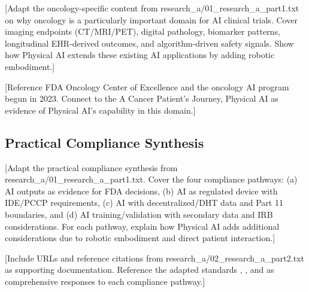 [Adapt the oncology-specific content from research\_a/01\_research\_a\_part1.txt
on why oncology is a particularly important domain for AI clinical trials.
Cover imaging endpoints (CT/MRI/PET), digital pathology, biomarker patterns,
longitudinal EHR-derived outcomes, and algorithm-driven safety signals. Show
how Physical AI extends these existing AI applications by adding robotic
embodiment.]

[Reference FDA Oncology Center of Excellence \cite{fda-oncology-guidance} and
the oncology AI program begun in 2023. Connect to the A Cancer Patient's
Journey, Physical AI \cite{patient-journey-paper} as evidence of Physical AI's
capability in this domain.]

\subsection{Practical Compliance Synthesis}
\label{subsec:compliance-synthesis}

[Adapt the practical compliance synthesis from research\_a/01\_research\_a\_part1.txt.
Cover the four compliance pathways: (a) AI outputs as evidence for FDA
decisions, (b) AI as regulated device with IDE/PCCP requirements, (c) AI
with decentralized/DHT data and Part 11 boundaries, and (d) AI
training/validation with secondary data and IRB considerations. For each
pathway, explain how Physical AI adds additional considerations due to
robotic embodiment and direct patient interaction.]

[Include URLs and reference citations from
research\_a/02\_research\_a\_part2.txt as supporting documentation. Reference
the adapted standards \cite{ich-adapt}, \cite{cfr50-adapt}, and
\cite{cfr312-adapt} as comprehensive responses to each compliance pathway.]
